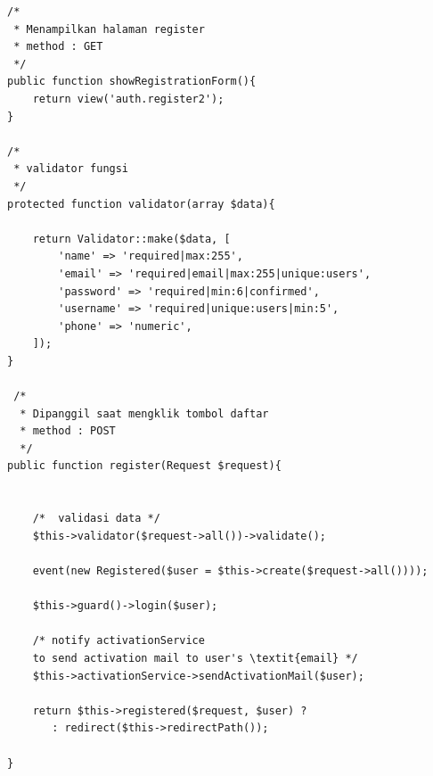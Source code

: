 \begin{lstlisting}[label=cdbe.01-01,style=php,caption=Implementasi Antarmuka Registrasi]
/* 
 * Menampilkan halaman register
 * method : GET 
 */
public function showRegistrationForm(){
	return view('auth.register2');
}

/*
 * validator fungsi 
 */
protected function validator(array $data){
	
	return Validator::make($data, [
		'name' => 'required|max:255',
		'email' => 'required|email|max:255|unique:users',
		'password' => 'required|min:6|confirmed',
		'username' => 'required|unique:users|min:5',
		'phone' => 'numeric',
	]);
}

 /*	
  * Dipanggil saat mengklik tombol daftar
  * method : POST 
  */
public function register(Request $request){

				
	/*	validasi data */
	$this->validator($request->all())->validate();

	event(new Registered($user = $this->create($request->all())));

	$this->guard()->login($user);

	/* notify activationService 
	to send activation mail to user's \textit{email} */
	$this->activationService->sendActivationMail($user);

	return $this->registered($request, $user) ?
	   : redirect($this->redirectPath());
	 
}
	  
	  
\end{lstlisting}
	  
      
      